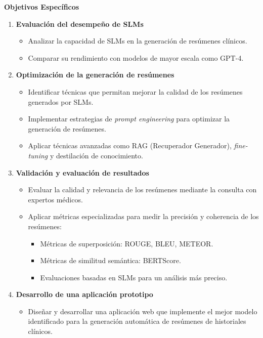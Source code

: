 \documentclass[../main.tex]{subfiles}
\begin{document}
\textbf{Objetivos Específicos}  
\begin{enumerate}
    \item \textbf{Evaluación del desempeño de SLMs}
    \begin{itemize}
        \item Analizar la capacidad de SLMs en la generación de resúmenes clínicos.
        \item Comparar su rendimiento con modelos de mayor escala como GPT-4.
    \end{itemize}
    \item \textbf{Optimización de la generación de resúmenes}
    \begin{itemize}
        \item Identificar técnicas que permitan mejorar la calidad de los resúmenes generados por SLMs.
        \item Implementar estrategias de \textit{prompt engineering} para optimizar la generación de resúmenes.
        \item Aplicar técnicas avanzadas como RAG (Recuperador Generador), \textit{fine-tuning} y destilación de conocimiento.
    \end{itemize}
    \item \textbf{Validación y evaluación de resultados}
    \begin{itemize}
        \item Evaluar la calidad y relevancia de los resúmenes mediante la consulta con expertos médicos.
        \item Aplicar métricas especializadas para medir la precisión y coherencia de los resúmenes:
        \begin{itemize}
            \item Métricas de superposición: ROUGE, BLEU, METEOR.
            \item Métricas de similitud semántica: BERTScore.
            \item Evaluaciones basadas en SLMs para un análisis más preciso.
        \end{itemize}
    \end{itemize}
    \item \textbf{Desarrollo de una aplicación prototipo}
    \begin{itemize}
        \item Diseñar y desarrollar una aplicación web que implemente el mejor modelo identificado para la generación
        automática de resúmenes de historiales clínicos.
    \end{itemize}
\end{enumerate}
\end{document}
